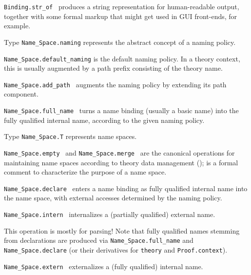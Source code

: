 \begin{isabellebody}
\begin{isamarkuptext}
\begin{description}
  \item \verb|Binding.str_of|~ produces a string
  representation for human-readable output, together with some formal
  markup that might get used in GUI front-ends, for example.

  \item Type \verb|Name_Space.naming| represents the abstract
  concept of a naming policy.

  \item \verb|Name_Space.default_naming| is the default naming policy.
  In a theory context, this is usually augmented by a path prefix
  consisting of the theory name.

  \item \verb|Name_Space.add_path|~ augments the
  naming policy by extending its path component.

  \item \verb|Name_Space.full_name|~ turns a
  name binding (usually a basic name) into the fully qualified
  internal name, according to the given naming policy.

  \item Type \verb|Name_Space.T| represents name spaces.

  \item \verb|Name_Space.empty|~ and \verb|Name_Space.merge|~ are the canonical operations for
  maintaining name spaces according to theory data management
  ();  is a formal comment
  to characterize the purpose of a name space.

  \item \verb|Name_Space.declare|~ enters a name binding as fully qualified internal name into
  the name space, with external accesses determined by the naming
  policy.

  \item \verb|Name_Space.intern|~ internalizes a
  (partially qualified) external name.

  This operation is mostly for parsing!  Note that fully qualified
  names stemming from declarations are produced via \verb|Name_Space.full_name| and \verb|Name_Space.declare|
  (or their derivatives for \verb|theory| and
  \verb|Proof.context|).

  \item \verb|Name_Space.extern|~ externalizes a
  (fully qualified) internal name.


\end{description}
\end{isamarkuptext}
\end{isabellebody}
